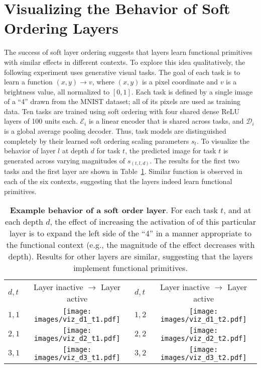 \documentclass{article}
\theoremstyle{definition}
\theoremstyle{remark}
\begin{document}
\section{Visualizing the Behavior of Soft Ordering Layers}
\label{sec:visualize}

The success of soft layer ordering suggests that layers learn functional primitives with similar effects in different contexts.
To explore this idea qualitatively, the following experiment uses generative visual tasks.
The goal of each task is to learn a function $(x,y) \rightarrow v$, where $(x,y)$ is a pixel coordinate and $v$ is a brightness value, all normalized to $[0,1]$.
Each task is defined by a single image of a ``4'' drawn from the MNIST dataset; all of its pixels are used as training data.
Ten tasks are trained using soft ordering with four shared dense ReLU layers of 100 units each.
$\mathcal{E}_i$ is a linear encoder that is shared across tasks, and $\mathcal{D}_i$ is a global average pooling decoder.
Thus, task models are distinguished completely by their learned soft ordering scaling parameters $s_t$.
To visualize the behavior of layer $l$ at depth $d$ for task $t$, the predicted image for task $t$ is generated across varying magnitudes of $s_{(t,l,d)}$.
The results for the first two tasks and the first layer are shown in Table~\ref{table:behavior}.
Similar function is observed in each of the six contexts, suggesting that the layers indeed learn functional primitives.
\begin{table}[h]
\setlength\tabcolsep{3pt}
\centering
\scriptsize
\begin{tabular}{lclc}
$d,t$ & Layer inactive $\longrightarrow$ Layer active & $d,t$ & Layer inactive $\longrightarrow$ Layer active \\
$1,1$ & \texttt{[image: images/viz\_d1\_t1.pdf]} & $1,2$ & \texttt{[image: images/viz\_d1\_t2.pdf]} \\
$2,1$ & \texttt{[image: images/viz\_d2\_t1.pdf]} & $2,2$ & \texttt{[image: images/viz\_d2\_t2.pdf]} \\
$3,1$ & \texttt{[image: images/viz\_d3\_t1.pdf]} & $3,2$ & \texttt{[image: images/viz\_d3\_t2.pdf]} \\

\end{tabular}

\caption{\label{table:behavior} \textbf{Example behavior of a soft order layer}. 
For each task $t$, and at each depth $d$, the effect of increasing the activation of of this particular layer is to expand the left side of the ``4'' in a manner appropriate to the functional context (e.g., the magnitude of the effect decreases with depth).
Results for other layers are similar, suggesting that the layers implement functional primitives.
}
\end{table} 
\end{document}
